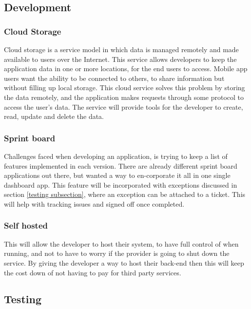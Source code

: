 \subsection{Development}

\subsubsection{Cloud Storage} \label{d-d:cloud_storage}

Cloud storage is a service model in which data is managed remotely and made available to users over the Internet. This service allows developers to keep the application data in one or more locations, for the end users to access. Mobile app users want the ability to be connected to others, to share information but without filling up local storage. This cloud service solves this problem by storing the data remotely, and the application makes requests through some protocol to access the user's data. The service will provide tools for the developer to create, read, update and delete the data.

\subsubsection{Sprint board} \label{d-d:sprint_board}
Challenges faced when developing an application, is trying to keep a list of features implemented in each version. There are already different sprint board applications out there, but wanted a way to en-corporate it all in one single dashboard app. This feature will be incorporated with exceptions discussed in section \ref{testing subsection}, where an exception can be attached to a ticket. This will help with tracking issues and signed off once completed.

\subsubsection{Self hosted} \label{d-d:self_hosted}
This will allow the developer to host their system, to have full control of when running, and not to have to worry if the provider is going to shut down the service. By giving the developer a way to host their back-end then this will keep the cost down of not having to pay for third party services.

\subsection{Testing} 


